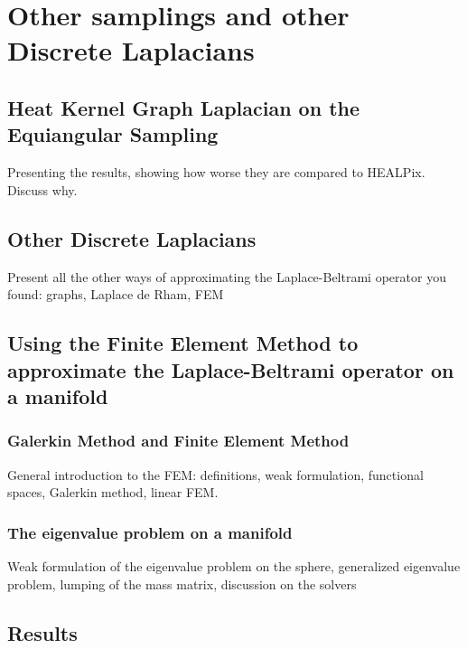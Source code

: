 

\section{Other samplings and other Discrete Laplacians}

\subsection{Heat Kernel Graph Laplacian on the Equiangular Sampling}
Presenting the results, showing how worse they are compared to HEALPix. Discuss why.
\subsection{Other Discrete Laplacians}
Present all the other ways of approximating the Laplace-Beltrami operator you found: graphs, Laplace de Rham, FEM
\subsection{Using the Finite Element Method to approximate the Laplace-Beltrami operator on a manifold}
\subsubsection{Galerkin Method and Finite Element Method}
General introduction to the FEM: definitions, weak formulation, functional spaces, Galerkin method, linear FEM.
\subsubsection{The eigenvalue problem on a manifold}
Weak formulation of the eigenvalue problem on the sphere, generalized eigenvalue problem, lumping of the mass matrix, discussion on the solvers
\subsection{Results}
